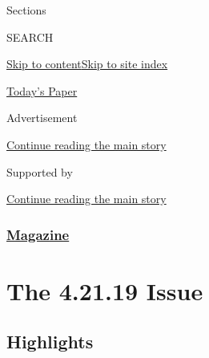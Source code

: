 Sections

SEARCH

\protect\hyperlink{site-content}{Skip to
content}\protect\hyperlink{site-index}{Skip to site index}

\href{https://myaccount.nytimes3xbfgragh.onion/auth/login?response_type=cookie\&client_id=vi}{}

\href{https://www.nytimes3xbfgragh.onion/section/todayspaper}{Today's
Paper}

Advertisement

\protect\hyperlink{after-top}{Continue reading the main story}

Supported by

\protect\hyperlink{after-sponsor}{Continue reading the main story}

\hypertarget{magazine}{%
\subsubsection{\texorpdfstring{\href{/section/magazine}{Magazine}}{Magazine}}\label{magazine}}

\hypertarget{the-42119-issue}{%
\section{The 4.21.19 Issue}\label{the-42119-issue}}

\hypertarget{highlights}{%
\subsection{Highlights}\label{highlights}}

